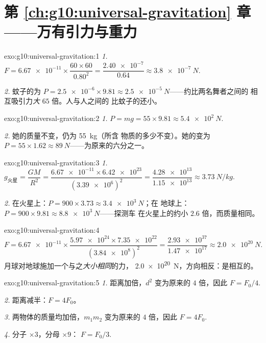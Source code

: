 \section*{第 \ref{ch:g10:universal-gravitation} 章——万有引力与重力}

\begin{solution}{exo:g10:universal-gravitation:1}
\emph{1.} $F = \num{6.67e-11} \times \dfrac{60 \times 60}{0.80^2}
= \dfrac{\num{2.40e-7}}{0.64} \approx \qty{3.8e-7}{N}$.

\emph{2.} 蚊子的为
$P = \num{2.5e-6} \times 9.81 \approx \qty{2.5e-5}{N}$——约比两名舞者之间的
相互吸引力\emph{大} $65$ 倍。人与人之间的
比蚊子的还小。
\end{solution}

\begin{solution}{exo:g10:universal-gravitation:2}
\emph{1.} $P = mg = 55 \times 9.81 \approx \qty{5.4e2}{N}$.

\emph{2.} 她的质量不变，仍为 \qty{55}{kg}（所含
物质的多少不变）。她的变为
$P = 55 \times 1.62 \approx \qty{89}{N}$——为原来的六分之一。
\end{solution}

\begin{solution}{exo:g10:universal-gravitation:3}
\emph{1.} $g_{\text{火星}} = \dfrac{G M}{R^2}
= \dfrac{\num{6.67e-11} \times \num{6.42e23}}{(\num{3.39e6})^2}
= \dfrac{\num{4.28e13}}{\num{1.15e13}} \approx \qty{3.73}{N/kg}$.

\emph{2.} 在火星上：$P = 900 \times 3.73 \approx \qty{3.4e3}{N}$；在
地球上：$P = 900 \times 9.81 \approx \qty{8.8e3}{N}$——探测车
在火星上的约小 $2.6$ 倍，而质量相同。
\end{solution}

\begin{solution}{exo:g10:universal-gravitation:4}
\[
F = \num{6.67e-11} \times
\frac{\num{5.97e24} \times \num{7.35e22}}{(\num{3.84e8})^2}
= \frac{\num{2.93e37}}{\num{1.47e17}}
\approx \qty{2.0e20}{N}.
\]
月球对地球施加一个与之\emph{大小相同}的力，
\qty{2.0e20}{N}，方向相反：是相互的。
\end{solution}

\begin{solution}{exo:g10:universal-gravitation:5}
\emph{1.} 距离加倍，$d^2$ 变为原来的 $4$ 倍，因此
$F = F_0/4$.

\emph{2.} 距离减半：$F = 4F_0$。

\emph{3.} 两物体的质量均加倍，$m_1 m_2$ 变为原来的 $4$ 倍，因此
$F = 4F_0$.

\emph{4.} 分子 $\times 3$，分母 $\times 9$：
$F = F_0/3$.
\end{solution}

